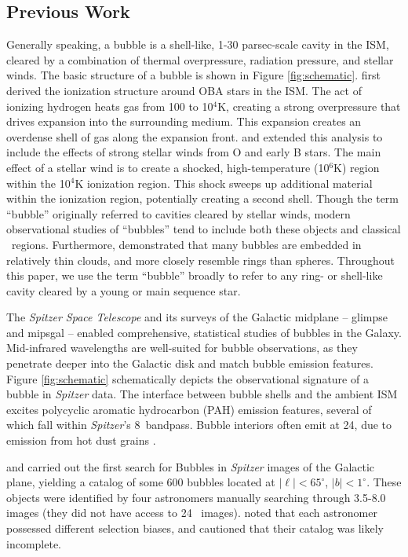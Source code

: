 \subsection{Previous Work}
\label{sec:previous}

Generally speaking, a bubble is a shell-like, 1-30 parsec-scale cavity in the ISM, cleared by a combination of thermal overpressure, radiation pressure, and stellar winds. The basic structure of a bubble is shown in Figure \ref{fig:schematic}. \cite{Stromgren39} first derived the ionization structure around OBA stars in the ISM. The act of ionizing hydrogen heats gas from 100 to 10$^4$K, creating a strong overpressure that drives expansion into the surrounding medium. This expansion creates an overdense shell of gas along the expansion front. \cite{Castor75} and \cite{Weaver77} extended this analysis to include the effects of strong stellar winds from O and early B stars. The main effect of a stellar wind is to create a shocked, high-temperature (10$^6$K) region within the 10$^4$K ionization region. This shock sweeps up additional material within the ionization region, potentially creating a second shell. Though the term ``bubble'' originally referred to cavities cleared by stellar winds, modern observational studies of ``bubbles'' tend to include both these objects and classical \hii\, regions. Furthermore, \cite{Beaumont10} demonstrated that many bubbles are embedded in relatively thin clouds, and more closely resemble rings than spheres. Throughout this paper, we use the term ``bubble'' broadly to refer to any ring- or shell-like cavity cleared by a young or main sequence star.

The \emph{Spitzer Space Telescope} and its surveys of the Galactic midplane -- {\sc glimpse} \citep{Benjamin03} and {\sc mipsgal} \citep{Carey09} -- enabled comprehensive, statistical studies of bubbles in the Galaxy. Mid-infrared wavelengths are well-suited for bubble observations, as they penetrate deeper into the Galactic disk and match bubble emission features. Figure \ref{fig:schematic} schematically depicts the observational signature of a bubble in \emph{Spitzer} data. The interface between bubble shells and the ambient ISM excites polycyclic aromatic hydrocarbon (PAH) emission features, several of which fall within \emph{Spitzer}'s 8\um\, bandpass. Bubble interiors often emit at 24\um, due to emission from hot dust grains \citep{Everett10}.

\cite{Churchwell06} and \cite{Churchwell07} carried out the first search for Bubbles in \emph{Spitzer} images of the Galactic plane, yielding  a catalog of some 600 bubbles located at $|\ell| < 65^\circ$, $|b| < 1^\circ$. These objects were identified by four astronomers manually searching through 3.5-8.0 \um\, images (they did not have access to 24 \um\, images). \cite{Churchwell06} noted that each astronomer possessed different selection biases, and cautioned that their catalog was likely incomplete.


